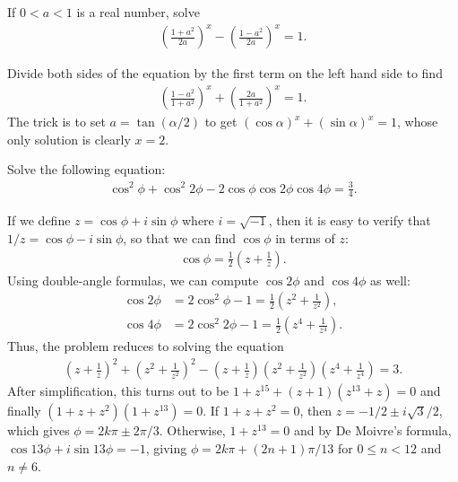 \documentclass[12pt,a4paper]{memoir}
\theoremstyle{definition}
\begin{document}
\begin{tcolorbox}
	\begin{question}
		If $0<a<1$ is a real number, solve
		\begin{align*}
			\left(\frac{1+a^2}{2a}\right)^x-\left(\frac{1-a^2}{2a}\right)^x=1.
		\end{align*}
	\end{question}
\end{tcolorbox}

\begin{solution}
	Divide both sides of the equation by the first term on the left hand side to find
	\begin{align*}
		\left(\frac{1-a^2}{1+a^2}\right)^x+\left(\frac{2a}{1+a^2}\right)^x=1.
	\end{align*}
	The trick is to set $a=\tan(\alpha/2)$ to get $(\cos \alpha)^x +  (\sin\alpha)^x=1$, whose only solution is clearly $x=2$.
\end{solution}

\begin{tcolorbox}
	\begin{question}
		Solve the following equation:
		\begin{align*}
			\cos^2\phi + \cos^2 2\phi - 2 \cos \phi \cos 2\phi \cos 4\phi = \frac{3}{4}.
		\end{align*}
	\end{question}
\end{tcolorbox}

\begin{solution}
	If we define $z=\cos \phi + i\sin \phi$ where $i=\sqrt{-1}$, then it is easy to verify that $1/z = \cos \phi - i \sin \phi$, so that we can find $\cos\phi$ in terms of $z$:
	\begin{align*}
		\cos\phi=\frac{1}{2}\left(z+\frac{1}{z}\right).
	\end{align*}
	Using double-angle formulas, we can compute $\cos 2\phi$ and $\cos 4\phi$ as well:
	\begin{align*}
		\cos 2\phi &= 2\cos^2\phi -1 = \frac{1}{2}\left(z^2+\frac{1}{z^2}\right),\\
		\cos 4\phi &= 2\cos^2 2\phi -1 = \frac{1}{2}\left(z^4+\frac{1}{z^4}\right).
	\end{align*}
	Thus, the problem reduces to solving the equation
	\begin{align*}
		\left(z+\frac{1}{z}\right)^2 + \left(z^2+\frac{1}{z^2}\right)^2 - \left(z+\frac{1}{z}\right)\left(z^2+\frac{1}{z^2}\right)\left(z^4+\frac{1}{z^4}\right) = 3.
	\end{align*}
	After simplification, this turns out to be $1+z^{15} + (z+1)(z^{13}+z)=0$ and finally $(1+z+z^2)(1+z^{13})=0$. If $1+z+z^2=0$, then $z=-1/2\pm i\sqrt 3/2$, which gives $\phi = 2k\pi\pm 2\pi/3$. Otherwise, $1+z^{13}=0$ and by De Moivre's formula, $\cos 13\phi + i\sin 13\phi = -1$, giving $\phi = 2k\pi + (2n+1)\pi/13$ for $0 \leq n < 12$ and $n\neq 6$.
\end{solution}
\end{document}
